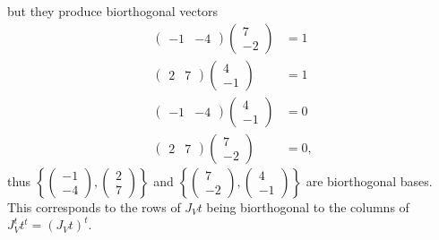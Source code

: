 \documentclass[aps,preprint]{revtex4}
\begin{document}
but they produce biorthogonal vectors 
\begin{align}
\left( 
\begin{array}{cc}
-1 & -4%
\end{array}%
\right) \left( 
\begin{array}{c}
7 \\ 
-2%
\end{array}%
\right) & =1 \\
\left( 
\begin{array}{cc}
2 & 7%
\end{array}%
\right) \left( 
\begin{array}{c}
4 \\ 
-1%
\end{array}%
\right) & =1 \\
\left( 
\begin{array}{cc}
-1 & -4%
\end{array}%
\right) \left( 
\begin{array}{c}
4 \\ 
-1%
\end{array}%
\right) & =0 \\
\left( 
\begin{array}{cc}
2 & 7%
\end{array}%
\right) \left( 
\begin{array}{c}
7 \\ 
-2%
\end{array}%
\right) & =0,
\end{align}%
thus $\left\{ \left( 
\begin{array}{c}
-1 \\ 
-4%
\end{array}%
\right) ,\left( 
\begin{array}{c}
2 \\ 
7%
\end{array}%
\right) \right\} $ and $\left\{ \left( 
\begin{array}{c}
7 \\ 
-2%
\end{array}%
\right) ,\left( 
\begin{array}{c}
4 \\ 
-1%
\end{array}%
\right) \right\} $ are biorthogonal bases. This corresponds to the rows of $%
J_{V}t$ being biorthogonal to the columns of $J_{V}^{t}t^{t}=\left(
J_{V}t\right) ^{t}.$
\end{document}
